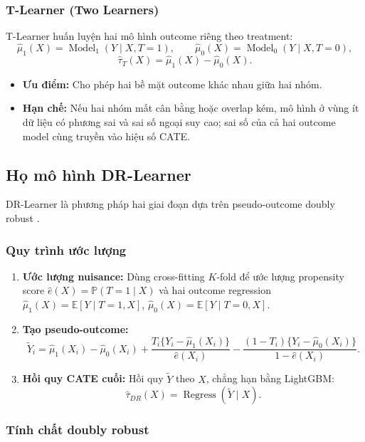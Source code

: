 \documentclass[11pt,a4paper]{article}
\newcommand{\Exp}{\mathbb{E}}
\newcommand{\Prob}{\mathbb{P}}
\begin{document}
\subsubsection{T-Learner (Two Learners)}
T-Learner huấn luyện hai mô hình outcome riêng theo treatment:
\[
\hat{\mu}_1(X)=\operatorname{Model}_1(Y\mid X,T=1),\qquad
\hat{\mu}_0(X)=\operatorname{Model}_0(Y\mid X,T=0),
\]
\[
\hat{\tau}_{T}(X)=\hat{\mu}_1(X)-\hat{\mu}_0(X).
\]
\begin{itemize}
    \item \textbf{Ưu điểm:} Cho phép hai bề mặt outcome khác nhau giữa hai nhóm.
    \item \textbf{Hạn chế:} Nếu hai nhóm mất cân bằng hoặc overlap kém, mô
    hình ở vùng ít dữ liệu có phương sai và sai số ngoại suy cao; sai số của
    cả hai outcome model cùng truyền vào hiệu số CATE.
\end{itemize}

\subsection{Họ mô hình DR-Learner}

DR-Learner là phương pháp hai giai đoạn dựa trên pseudo-outcome doubly
robust \cite{kennedy2020,robins1994}.

\subsubsection{Quy trình ước lượng}
\begin{enumerate}
\item \textbf{Ước lượng nuisance:} Dùng cross-fitting $K$-fold để ước lượng
propensity score $\hat e(X)=\Prob(T=1\mid X)$ và hai outcome regression
$\hat\mu_1(X)=\Exp[Y\mid T=1,X]$, $\hat\mu_0(X)=\Exp[Y\mid T=0,X]$.
\item \textbf{Tạo pseudo-outcome:}
\begin{equation}
\tilde{Y}_i = \hat{\mu}_1(X_i) - \hat{\mu}_0(X_i)
+ \frac{T_i\{Y_i - \hat{\mu}_1(X_i)\}}{\hat{e}(X_i)}
- \frac{(1-T_i)\{Y_i - \hat{\mu}_0(X_i)\}}{1 - \hat{e}(X_i)}.
\end{equation}
\item \textbf{Hồi quy CATE cuối:} Hồi quy $\tilde Y$ theo $X$, chẳng hạn
bằng LightGBM:
\[
\hat{\tau}_{DR}(X)=\operatorname{Regress}(\tilde{Y}\mid X).
\]
\end{enumerate}

\subsubsection{Tính chất doubly robust}
\end{document}
